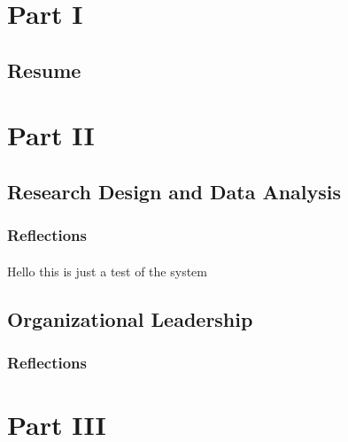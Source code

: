 \documentclass[12pt,titlepage]{article}
\begin{document}
\maketitle
\tableofcontents

\section{Part I}
\subsection{Resume}


\section{Part II}\label{Course Chapters}
\subsection{Research Design and Data Analysis}
\subsubsection{Reflections}
\label{subs:Research Design Reflection}
\paragraph{}
Hello this is just a test of the system



\subsection{Organizational Leadership}
\subsubsection{Reflections}\label{Org Leadership Reflection}


\section{Part III}\label{Summary and Conclusion}



\end{document}
